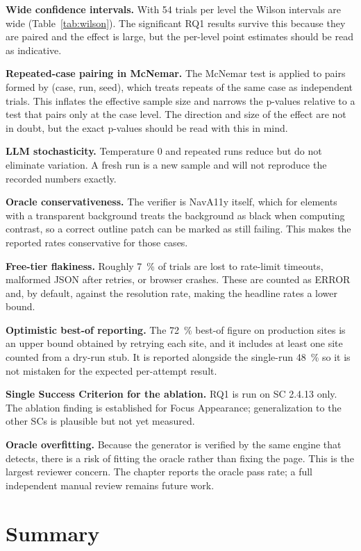 \documentclass[11pt]{article}
\begin{document}
\textbf{Wide confidence intervals.} With 54 trials per level the Wilson intervals are
wide (Table~\ref{tab:wilson}). The significant RQ1 results survive this because they
are paired and the effect is large, but the per-level point estimates should be read
as indicative.

\textbf{Repeated-case pairing in McNemar.} The McNemar test is applied to pairs formed
by (case, run, seed), which treats repeats of the same case as independent trials.
This inflates the effective sample size and narrows the p-values relative to a test
that pairs only at the case level. The direction and size of the effect are not in
doubt, but the exact p-values should be read with this in mind.

\textbf{LLM stochasticity.} Temperature 0 and repeated runs reduce but do not
eliminate variation. A fresh run is a new sample and will not reproduce the recorded
numbers exactly.

\textbf{Oracle conservativeness.} The verifier is NavA11y itself, which for elements
with a transparent background treats the background as black when computing contrast,
so a correct outline patch can be marked as still failing. This makes the reported
rates conservative for those cases.

\textbf{Free-tier flakiness.} Roughly \SI{7}{\percent} of trials are lost to
rate-limit timeouts, malformed JSON after retries, or browser crashes. These are
counted as ERROR and, by default, against the resolution rate, making the headline
rates a lower bound.

\textbf{Optimistic best-of reporting.} The \SI{72}{\percent} best-of figure on
production sites is an upper bound obtained by retrying each site, and it includes at
least one site counted from a dry-run stub. It is reported alongside the single-run
\SI{48}{\percent} so it is not mistaken for the expected per-attempt result.

\textbf{Single Success Criterion for the ablation.} RQ1 is run on SC 2.4.13 only. The
ablation finding is established for Focus Appearance; generalization to the other SCs
is plausible but not yet measured.

\textbf{Oracle overfitting.} Because the generator is verified by the same engine that
detects, there is a risk of fitting the oracle rather than fixing the page. This is
the largest reviewer concern. The chapter reports the oracle pass rate; a full
independent manual review remains future work.

\section{Summary}
\end{document}
